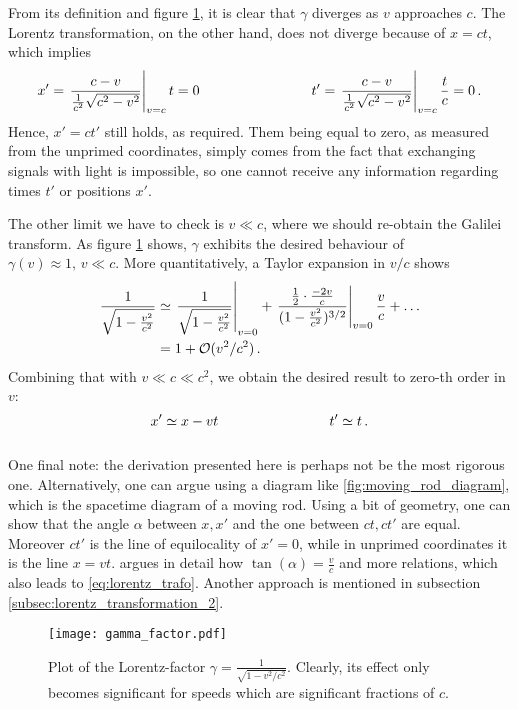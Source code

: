 From its definition and figure \ref{fig:gamma_factor}, it is clear that $\gamma$ diverges as $v$ approaches $c$. The Lorentz transformation, on the other hand, does not diverge because of $x = ct$, which implies
\begin{align*}
	x' = \eval{\frac{c - v}{\frac{1}{c^2} \sqrt{c^2 - v^2}}}_{v = c} t = 0
	\manyqquad
	t' = \eval{\frac{c - v}{\frac{1}{c^2} \sqrt{c^2 - v^2}}}_{v = c} \frac{t}{c} = 0 \, .
\end{align*}
Hence, $x' = ct'$ still holds, as required. Them being equal to zero, as measured from the unprimed coordinates, simply comes from the fact that exchanging signals with light is impossible, so one cannot receive any information regarding times $t'$ or positions $x'$.


The other limit we have to check is $v \ll c$, where we should re-obtain the Galilei transform. As figure \ref{fig:gamma_factor} shows, $\gamma$ exhibits the desired behaviour of $\gamma(v) \approx 1, \, v \ll c$. More quantitatively, a Taylor expansion in $v / c$ shows
\begin{align*}
	\frac{1}{\sqrt{1 - \frac{v^2}{c^2}}} &\simeq \eval{\frac{1}{\sqrt{1 - \frac{v^2}{c^2}}}}_{v = 0} + \eval{\frac{\frac{1}{2} \cdot \frac{-2 v}{c}}{(1 - \frac{v^2}{c^2})^{3/2}}}_{v = 0} \frac{v}{c} + \dots
	\\
	&= 1 + \mathcal{O}(v^2 / c^2) \, .
\end{align*}
Combining that with $v \ll c \ll c^2$, we obtain the desired result to zero-th order in $v$:
\begin{equation*}
	x' \simeq x - vt
	\qquad \qquad \qquad \qquad
	t' \simeq t
	\, .
\end{equation*}\\



One final note: the derivation presented here is perhaps not be the most rigorous one. Alternatively, one can argue using a diagram like \ref{fig:moving_rod_diagram}, which is the spacetime diagram of a moving rod. Using a bit of geometry, one can show that the angle $\alpha$ between $x, x'$ and the one between $ct, ct'$ are equal. Moreover $ct'$ is the line of equilocality of $x' = 0$, while in unprimed coordinates it is the line $x = vt$. \cite{giulini_srt} argues in detail how $\tan(\alpha) = \frac{v}{c}$ and more relations, which also leads to \eqref{eq:lorentz_trafo}. Another approach is mentioned in subsection \ref{subsec:lorentz_transformation_2}.



\begin{figure}
	\centering
	
	\texttt{[image: gamma\_factor.pdf]}
	
	\caption[Plot of the Lorentz-factor]{Plot of the Lorentz-factor $\gamma = \frac{1}{\sqrt{1 - v^2 / c^2}}$.	Clearly, its effect only becomes significant for speeds which are significant fractions of $c$.}
	\label{fig:gamma_factor}
\end{figure}



